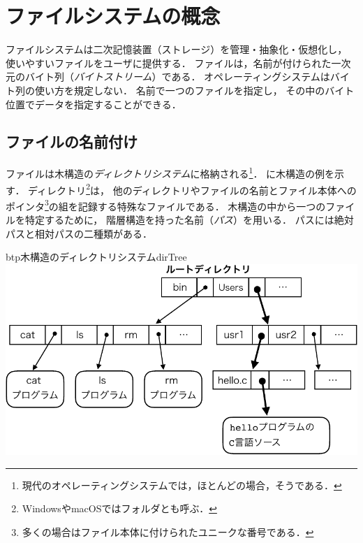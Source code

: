 \chapter{ファイルシステムの概念}
\label{fileSystemConcepts}
ファイルシステムは二次記憶装置（ストレージ）を管理・抽象化・仮想化し，
使いやすいファイルをユーザに提供する．
ファイルは，名前が付けられた一次元のバイト列（\emph{バイトストリーム}）である．
オペレーティングシステムはバイト列の使い方を規定しない．
名前で一つのファイルを指定し，
その中のバイト位置でデータを指定することができる．


\section{ファイルの名前付け}
ファイルは木構造の\emph{ディレクトリシステム}に格納される\footnote{
  現代のオペレーティングシステムでは，ほとんどの場合，そうである．}．
に木構造の例を示す．
ディレクトリ\footnote{WindowsやmacOSではフォルダとも呼ぶ．}は，
他のディレクトリやファイルの名前とファイル本体へのポインタ\footnote{
  多くの場合はファイル本体に付けられたユニークな番号である．
}の組を記録する特殊なファイルである．
木構造の中から一つのファイルを特定するために，
階層構造を持った名前（\emph{パス}）を用いる．
パスには絶対パスと相対パスの二種類がある．

\begin{myfig}{btp}{木構造のディレクトリシステム}{dirTree}
  \includegraphics[scale=.8]{Fig/dirTree-crop.pdf}
\end{myfig}

